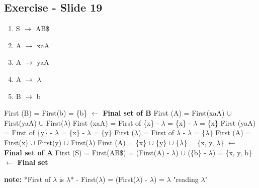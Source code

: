 \documentclass{report}
\begin{document}
\vspace{-3em}

\subsection{Exercise - Slide 19}
\vspace{-1.5em}
\begin{multicols}{2}
  \begin{enumerate}
    \setlength\itemsep{-.25em}
    \item S $\rightarrow$ AB\$
    \item A $\rightarrow$ xaA
    \item A $\rightarrow$ yaA
    \item A $\rightarrow$ $\lambda$
    \item B $\rightarrow$ b\newline\newline
  \end{enumerate}
  \setlength{\leftskip}{-12em}
First (B) = First(b) = \{b\}  $\leftarrow$ \textbf{Final set of B}\newline
First (A) = First(xaA) $\cup$  First(yaA) $\cup$  First($\lambda$)\newline
\indent\hspace{.25cm}First (xaA) = First of \{x\} - $\lambda$ = \{x\} - $\lambda$ = \{x\}\newline
\indent\hspace{.25cm}First (yaA) = First of \{y\} - $\lambda$ = \{x\} - $\lambda$ = \{y\}\newline
\indent\hspace{.25cm}First ($\lambda$) = First of {$\lambda$} - $\lambda$ = \{$\lambda$\}\newline
First (A) = First(x) $\cup$  First(y) $\cup$  First($\lambda$)\newline
First (A) = \{x\} $\cup$  \{y\} $\cup$  \{$\lambda$\} = \{x, y, $\lambda$\} $\leftarrow$ \textbf{Final set of A}\newline
First (S) = First(AB\$) = (First(A) - $\lambda$) $\cup$ (\{b\} - $\lambda$) = \{x, y, b\} $\leftarrow$ \textbf{Final set}
\end{multicols}
\vspace{-1em}
\noindent\textbf{note:} *First of $\lambda$ is $\lambda$* -
First($\lambda$) = (First($\lambda$) - $\lambda$) = {$\lambda$} "reading $\lambda$" 
\end{document}
